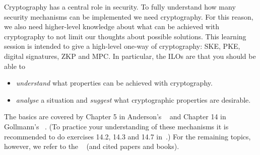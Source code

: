 Cryptography has a central role in security.
To fully understand how many security mechanisms can be implemented we need 
cryptography.
For this reason, we also need higher-level knowledge about what can be achieved 
with cryptography to not limit our thoughts about possible solutions.
This learning session is intended to give a high-level one-way of 
cryptography: \ac{SKE}, \ac{PKE}, digital signatures, \ac{ZKP} and \ac{MPC}.
In particular, the \acp{ILO} are that you should be able to
\begin{itemize}
  \item \emph{understand} what properties can be achieved with cryptography.
  \item \emph{analyse} a situation and \emph{suggest} what cryptographic 
    properties are desirable.
\end{itemize}

The basics are covered by
Chapter 5 in Anderson's ~\cite{Anderson2008sea} and
Chapter 14 in Gollmann's ~\cite{Gollmann2011cs}.
(To practice your understanding of these mechanisms it is recommended to do 
exercises 14.2, 14.3 and 14.7 in~\cite{Gollmann2011cs}.)
For the remaining topics, however, we refer to the ~\cite{EOCS} 
(and cited papers and books).
